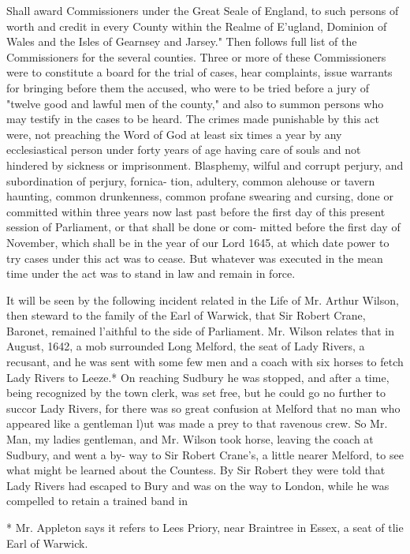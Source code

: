 \documentclass{book}
\begin{document}
Shall award Commissioners under the Great Seale of England, 
to such persons of worth and credit in every County within the 
Realme of E'ugland, Dominion of Wales and the Isles of Gearnsey 
and Jarsey." Then follows full list of the Commissioners for the 
several counties. Three or more of these Commissioners were to 
constitute a board for the trial of cases, hear complaints, issue 
warrants for bringing before them the accused, who were to be 
tried before a jury of "twelve good and lawful men of the 
county," and also to summon persons who may testify in the 
cases to be heard. The crimes made punishable by this act were, 
not preaching the Word of God at least six times a year by any 
ecclesiastical person under forty years of age having care of souls 
and not hindered by sickness or imprisonment. Blasphemy, 
wilful and corrupt perjury, and subordination of perjury, fornica- 
tion, adultery, common alehouse or tavern haunting, common 
drunkenness, common profane swearing and cursing, done or 
committed within three years now last past before the first day of 
this present session of Parliament, or that shall be done or com- 
mitted before the first day of November, which shall be in the 
year of our Lord 1645, at which date power to try cases under 
this act was to cease. But whatever was executed in the mean 
time under the act was to stand in law and remain in force. 

It will be seen by the following incident related in the Life of 
Mr. Arthur Wilson, then steward to the family of the Earl of 
Warwick, that Sir Robert Crane, Baronet, remained l'aithful to 
the side of Parliament. Mr. Wilson relates that in August, 1642, 
a mob surrounded Long Melford, the seat of Lady Rivers, a 
recusant, and he was sent with some few men and a coach with 
six horses to fetch Lady Rivers to Leeze.* On reaching Sudbury 
he was stopped, and after a time, being recognized by the town 
clerk, was set free, but he could go no further to succor Lady 
Rivers, for there was so great confusion at Melford that no man 
who appeared like a gentleman l)ut was made a prey to that 
ravenous crew. So Mr. Man, my ladies gentleman, and Mr. 
Wilson took horse, leaving the coach at Sudbury, and went a by- 
way to Sir Robert Crane's, a little nearer Melford, to see what 
might be learned about the Countess. By Sir Robert they were 
told that Lady Rivers had escaped to Bury and was on the way 
to London, while he was compelled to retain a trained band in 



* Mr. Appleton says it refers to Lees Priory, near Braintree in Essex, 
a seat of tlie Earl of Warwick. 
\end{document}
